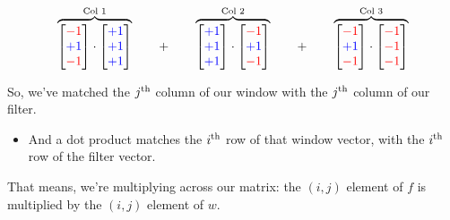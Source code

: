         \begin{equation}
            \overbrace{
                \begin{bmatrix}
                    \textcolor{red}{-1} \\ \textcolor{blue}{+1} \\ \textcolor{red}{-1}
                \end{bmatrix}
                \cdot 
                \begin{bmatrix}
                    \textcolor{blue}{+1} \\ \textcolor{blue}{+1} \\ \textcolor{blue}{+1}
                \end{bmatrix}
            }^{\text{Col 1}}
            \qquad+\qquad
            \overbrace{
                \begin{bmatrix}
                    \textcolor{blue}{+1} \\ \textcolor{blue}{+1} \\ \textcolor{blue}{+1}
                \end{bmatrix}
                \cdot 
                \begin{bmatrix}
                    \textcolor{red}{-1} \\ \textcolor{blue}{+1} \\ \textcolor{red}{-1} 
                \end{bmatrix}
            }^{\text{Col 2}}
            \qquad+\qquad
            \overbrace{
                \begin{bmatrix}
                    \textcolor{red}{-1} \\ \textcolor{blue}{+1} \\ \textcolor{red}{-1} 
                \end{bmatrix} 
                \cdot
                \begin{bmatrix}
                    \textcolor{red}{-1} \\ \textcolor{red}{-1} \\ \textcolor{red}{-1} 
                \end{bmatrix} 
            }^{\text{Col 3}}
        \end{equation}

        So, we've matched the $j^{ \text{th} }$ column of our window with the $j^{ \text{th} }$ column of our filter.

        \begin{itemize}
            \item And a dot product matches the $i^{ \text{th} }$ row of that window vector, with the $i^{ \text{th} }$ row of the filter vector.
        \end{itemize}

        That means, we're multiplying  across our matrix: the $(i,j)$ element of $f$ is multiplied by the $(i,j)$ element of $w$.\\

